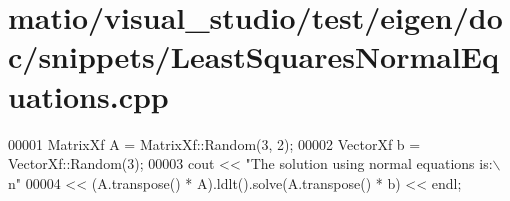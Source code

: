 \hypertarget{matio_2visual__studio_2test_2eigen_2doc_2snippets_2_least_squares_normal_equations_8cpp_source}{}\section{matio/visual\+\_\+studio/test/eigen/doc/snippets/\+Least\+Squares\+Normal\+Equations.cpp}
\label{matio_2visual__studio_2test_2eigen_2doc_2snippets_2_least_squares_normal_equations_8cpp_source}

\begin{DoxyCode}
00001 MatrixXf A = MatrixXf::Random(3, 2);
00002 VectorXf b = VectorXf::Random(3);
00003 cout << \textcolor{stringliteral}{"The solution using normal equations is:\(\backslash\)n"}
00004      << (A.transpose() * A).ldlt().solve(A.transpose() * b) << endl;
\end{DoxyCode}
